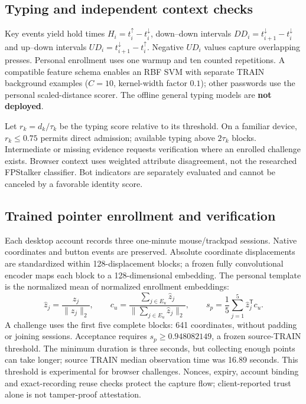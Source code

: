 \documentclass[10pt,a4paper]{article}
\begin{document}
\subsection{Typing and independent context checks}
Key events yield hold times $H_i=t_i^{\uparrow}-t_i^{\downarrow}$, down--down intervals $DD_i=t_{i+1}^{\downarrow}-t_i^{\downarrow}$ and up--down intervals $UD_i=t_{i+1}^{\downarrow}-t_i^{\uparrow}$. Negative $UD_i$ values capture overlapping presses. Personal enrollment uses one warmup and ten counted repetitions. A compatible feature schema enables an RBF SVM with separate TRAIN background examples ($C=10$, kernel-width factor $0.1$); other passwords use the personal scaled-distance scorer. The offline general typing models are \textbf{not deployed}.

Let $r_k=d_k/\tau_k$ be the typing score relative to its threshold. On a familiar device, $r_k\leq0.75$ permits direct admission; available typing above $2\tau_k$ blocks. Intermediate or missing evidence requests verification where an enrolled challenge exists. Browser context uses weighted attribute disagreement, not the researched FPStalker classifier. Bot indicators are separately evaluated and cannot be canceled by a favorable identity score.

\subsection{Trained pointer enrollment and verification}
Each desktop account records three one-minute mouse/trackpad sessions. Native coordinates and button events are preserved. Absolute coordinate displacements are standardized within 128-displacement blocks; a frozen fully convolutional encoder maps each block to a 128-dimensional embedding. The personal template is the normalized mean of normalized enrollment embeddings:
\[
 \hat z_j=\frac{z_j}{\|z_j\|_2},\qquad
 c_u=\frac{\sum_{j\in E_u}\hat z_j}{\|\sum_{j\in E_u}\hat z_j\|_2},\qquad
 s_p=\frac{1}{5}\sum_{j=1}^{5}\hat z_j^{\mathsf T}c_u .
\]
A challenge uses the first five complete blocks: 641 coordinates, without padding or joining sessions. Acceptance requires $s_p\geq0.948082149$, a frozen source-TRAIN threshold. The minimum duration is three seconds, but collecting enough points can take longer; source TRAIN median observation time was 16.89 seconds. This threshold is experimental for browser challenges. Nonces, expiry, account binding and exact-recording reuse checks protect the capture flow; client-reported trust alone is not tamper-proof attestation.
\end{document}
